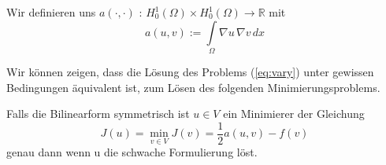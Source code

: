Wir definieren uns $a( \cdot , \cdot )$ : $H^1_0 (\Omega) \times H^1_0(\Omega) \rightarrow \mathbb{R}$ mit
\begin{equation*}
a(u,v) := \int\limits_{\Omega} \nabla u \, \nabla v \, dx
\end{equation*}

Wir können zeigen, dass die Lösung des Problems (\ref{eq:vary}) unter gewissen Bedingungen äquivalent ist, zum Lösen des folgenden Minimierungsproblems.

\begin{Lemma}
Falls die Bilinearform symmetrisch ist $u \in V$ ein Minimierer der Gleichung
\begin{equation} \label{eq:mini}
J(u) = \min_{v \in V} J(v) = \dfrac{1}{2} a(u,v) - f(v)
\end{equation}
genau dann wenn u die schwache Formulierung löst.
\end{Lemma}


